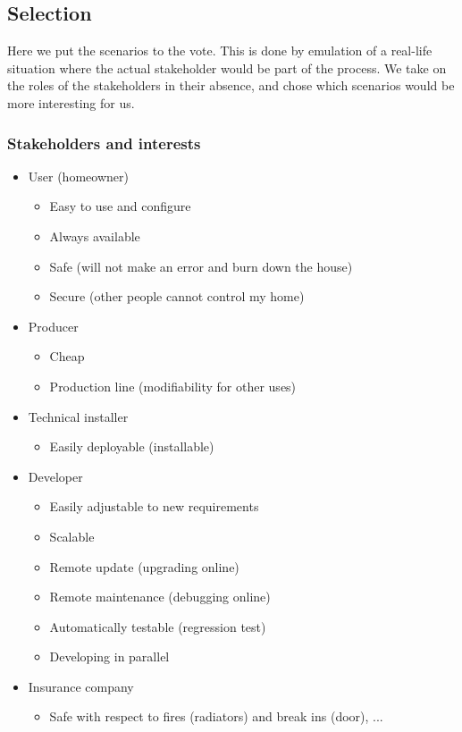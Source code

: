 \documentclass[a4paper,10pt]{article}
\begin{document}
\subsection{Selection}
\label{sec:selection}
Here we put the scenarios to the vote. This is done by emulation of a real-life situation where the actual stakeholder would
be part of the process. We take on the roles of the stakeholders in their absence, and chose which scenarios would be more
interesting for us.

\subsubsection{Stakeholders and interests}

\begin{itemize}
\item User (homeowner)
\begin{itemize}
\item Easy to use and configure
\item Always available
\item Safe (will not make an error and burn down the house)
\item Secure (other people cannot control my home)
\end{itemize}
\item Producer
\begin{itemize}
\item Cheap
\item Production line (modifiability for other uses)
\end{itemize}
\item Technical installer
\begin{itemize}
\item Easily deployable (installable)
\end{itemize}
\item Developer
\begin{itemize}
\item Easily adjustable to new requirements
\item Scalable
\item Remote update (upgrading online)
\item Remote maintenance (debugging online)
\item Automatically testable (regression test)
\item Developing in parallel
\end{itemize}
\item Insurance company
\begin{itemize}
\item Safe with respect to fires (radiators) and break ins (door), ...
\end{itemize}
\end{itemize}
\end{document}

